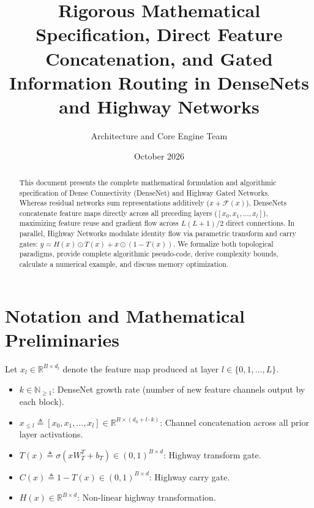 \documentclass[11pt,a4paper]{article}
\title{\textbf{Rigorous Mathematical Specification, Direct Feature Concatenation, and Gated Information Routing in DenseNets and Highway Networks}}
\author{Architecture and Core Engine Team}
\date{October 2026}
\theoremstyle{definition}
\begin{document}
\maketitle

\begin{abstract}
This document presents the complete mathematical formulation and algorithmic specification of Dense Connectivity (DenseNet) and Highway Gated Networks. Whereas residual networks sum representations additively ($x + \mathcal{F}(x)$), DenseNets concatenate feature maps directly across all preceding layers ($[x_0, x_1, \dots, x_l]$), maximizing feature reuse and gradient flow across $L(L+1)/2$ direct connections. In parallel, Highway Networks modulate identity flow via parametric transform and carry gates: $y = H(x) \odot T(x) + x \odot (1 - T(x))$. We formalize both topological paradigms, provide complete algorithmic pseudo-code, derive complexity bounds, calculate a numerical example, and discuss memory optimization.
\end{abstract}

\section{Notation and Mathematical Preliminaries}

Let $x_l \in \mathbb{R}^{B \times d_l}$ denote the feature map produced at layer $l \in \{0, 1, \dots, L\}$.

\begin{itemize}
    \item $k \in \mathbb{N}_{\ge 1}$: DenseNet growth rate (number of new feature channels output by each block).
    \item $x_{\le l} \triangleq [x_0, x_1, \dots, x_l] \in \mathbb{R}^{B \times (d_0 + l \cdot k)}$: Channel concatenation across all prior layer activations.
    \item $T(x) \triangleq \sigma(x W_T^T + b_T) \in (0, 1)^{B \times d}$: Highway transform gate.
    \item $C(x) \triangleq 1 - T(x) \in (0, 1)^{B \times d}$: Highway carry gate.
    \item $H(x) \in \mathbb{R}^{B \times d}$: Non-linear highway transformation.
\end{itemize}
\end{document}
